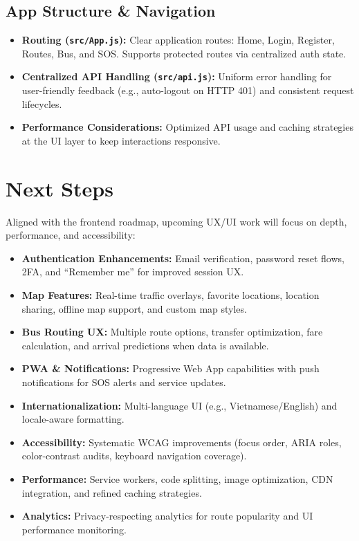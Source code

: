 \subsection{App Structure \& Navigation}
\begin{itemize}
    \item \textbf{Routing (\texttt{src/App.js}):} Clear application routes: Home, Login, Register, Routes, Bus, and SOS. Supports protected routes via centralized auth state.
    \item \textbf{Centralized API Handling (\texttt{src/api.js}):} Uniform error handling for user-friendly feedback (e.g., auto-logout on HTTP 401) and consistent request lifecycles.
    \item \textbf{Performance Considerations:} Optimized API usage and caching strategies at the UI layer to keep interactions responsive.
\end{itemize}

\section{Next Steps}

Aligned with the frontend roadmap, upcoming UX/UI work will focus on depth, performance, and accessibility:

\begin{itemize}
    \item \textbf{Authentication Enhancements:} Email verification, password reset flows, 2FA, and ``Remember me'' for improved session UX.
    \item \textbf{Map Features:} Real-time traffic overlays, favorite locations, location sharing, offline map support, and custom map styles.
    \item \textbf{Bus Routing UX:} Multiple route options, transfer optimization, fare calculation, and arrival predictions when data is available.
    \item \textbf{PWA \& Notifications:} Progressive Web App capabilities with push notifications for SOS alerts and service updates.
    \item \textbf{Internationalization:} Multi-language UI (e.g., Vietnamese/English) and locale-aware formatting.
    \item \textbf{Accessibility:} Systematic WCAG improvements (focus order, ARIA roles, color-contrast audits, keyboard navigation coverage).
    \item \textbf{Performance:} Service workers, code splitting, image optimization, CDN integration, and refined caching strategies.
    \item \textbf{Analytics:} Privacy-respecting analytics for route popularity and UI performance monitoring.
\end{itemize}

